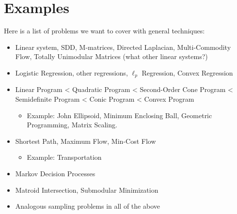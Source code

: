 
\section*{Examples}

Here is a list of problems we want to cover with general techniques: 
\begin{itemize}
\item Linear system, SDD, M-matrices, Directed Laplacian, Multi-Commodity
Flow, Totally Unimodular Matrices (what other linear systems?) 
\item Logistic Regression, other regressions, $\ell_{p}$ Regression, Convex
Regression
\item Linear Program < Quadratic Program < Second-Order Cone Program < Semidefinite
Program < Conic Program < Convex Program
\begin{itemize}
\item Example: John Ellipsoid, Minimum Enclosing Ball, Geometric Programming,
Matrix Scaling.
\end{itemize}
\item Shortest Path, Maximum Flow, Min-Cost Flow
\begin{itemize}
\item Example: Transportation
\end{itemize}
\item Markov Decision Processes
\item Matroid Intersection, Submodular Minimization
\item Analogous sampling problems in all of the above
\end{itemize}

